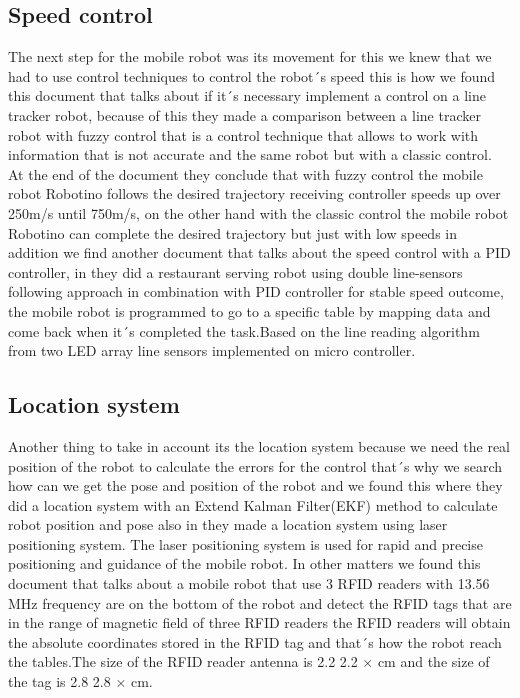 \subsection{Speed control}
The next step for the mobile robot was its movement for this we knew that we had to use control techniques to control the robot´s speed this is how we found this document \citep{abril2012analisis} that talks about if it´s necessary implement a control on a line tracker robot, because of this they made a comparison between a line tracker robot with fuzzy control that is a control technique that allows to work with information that is not accurate and the same robot but with a classic control. At the end of the document they conclude that with fuzzy control the mobile robot Robotino follows the desired trajectory receiving controller speeds up over 250m/s until 750m/s, on the other hand with the classic control the mobile robot Robotino can complete the desired trajectory but just with low speeds in addition we find another document that talks about the speed control with a PID controller, in \citep{thanh2019restaurant} they did a restaurant serving robot using double line-sensors following approach in combination with PID controller for stable speed outcome, the mobile robot is programmed to go to a specific table by mapping data and come back when it´s completed the task.Based on the line reading algorithm from two LED array line sensors implemented on micro controller.

\subsection{Location system}
Another thing to take in account its the location system because we need the real position of the robot to calculate the errors for the control that´s why we search how can we get the pose and position of the robot and we found this\citep{yuan2016rgb} where they did a location system with an Extend Kalman Filter(EKF) method to calculate robot position and pose also in \citep{tzou2009high} they made a location system using laser positioning system. The laser positioning system is used for rapid and precise positioning and guidance of the mobile robot. In other matters we found this document \citep{oltean2010position} that talks about a mobile robot that use 3 RFID readers with 13.56 MHz frequency are on the bottom of the robot and detect the RFID tags that are in the range of magnetic field of three RFID readers the RFID readers will obtain the absolute coordinates stored in the RFID tag and that´s how the robot reach the tables.The size of the RFID reader antenna
is 2.2 2.2 × cm and the size of the tag is 2.8 2.8 × cm.




